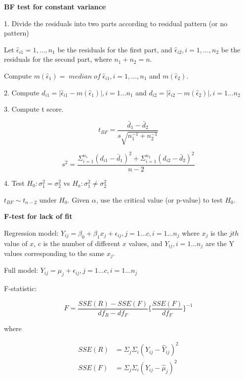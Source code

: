 \documentclass[10pt]{article}
\begin{document}
\begin{multicols}{3}
    \textbf{BF test for constant variance}

    1. Divide the residuals into two parts according to residual pattern (or no pattern)

    Let $\hat\epsilon_{i1} = 1, \dots, n_1$ be the residuals for the first part, and
    $\hat\epsilon_{i2}, i = 1, \dots, n_2$ be the residuals for the second part,
    where $n_1 + n_2 = n$.

    Compute $m(\hat\epsilon_1) = \;median\; of\; \hat\epsilon_{i1}, i = 1,\dots,n_1$ and $m(\hat\epsilon_2)$.

    2. Compute $d_{i1} = |\hat\epsilon_{i1} - m(\hat\epsilon_{1})|, i = 1\dots n_1$ and
    $d_{i2} = |\hat\epsilon_{i2} - m(\hat\epsilon_{2})|, i = 1\dots n_2$

    3. Compute t score.

    \begin{equation}\label{t score for BF test}
        t_{BF} = \frac{\bar d_1 - \bar d_2}{s \sqrt {n_1^{-1} + n_2^{-1} } }
    \end{equation}

    \begin{equation}\label{variance for BF test}
        s^2 = \frac{\Sigma_{i=1}^{n_1} (d_{i1} - \bar d_{1})^2 + \Sigma_{i=1}^{n_2} (d_{i2} - \bar d_{2})^2}{n - 2}
    \end{equation}

    4. Test $H_0: \sigma_1^2 = \sigma_2^2$ vs $H_a: \sigma_1^2 \ne \sigma_2^2$

    $t_{BF} \sim t_{n-2}$ under $H_0$. Given $\alpha$, use the critical value (or p-value) to test $H_0$.

    \textbf{F-test for lack of fit}

    Regression model: $Y_{ij} = \beta_0 + \beta_1 x_j + \epsilon_{ij}, j = 1\dots c, i = 1\dots n_j$
    where $x_j$ is the $jth$ value of $x$, $c$ is the number of different $x$ values, and
    $Y_{ij}, i = 1\dots n_j$ are the Y values corresponding to the same $x_j$.

    Full model: $Y_{ij} = \mu_j + \epsilon_{ij}, j = 1 \dots c, i = 1 \dots n_j$

    F-statistic:

    \begin{equation}\label{F statistic}
        F = \frac{SSE(R) - SSE(F)}{df_R - df_F} \{\frac{SSE(F)}{df_F}\}^{-1}
    \end{equation}

    where

    \begin{align}
        SSE(R) & = \Sigma_j \Sigma_i (Y_{ij} - \hat Y_{ij})^2 \\
        SSE(F) & = \Sigma_j \Sigma_i (Y_{ij} - \hat \mu_j)^2
    \end{align}


\end{multicols}
\end{document}
